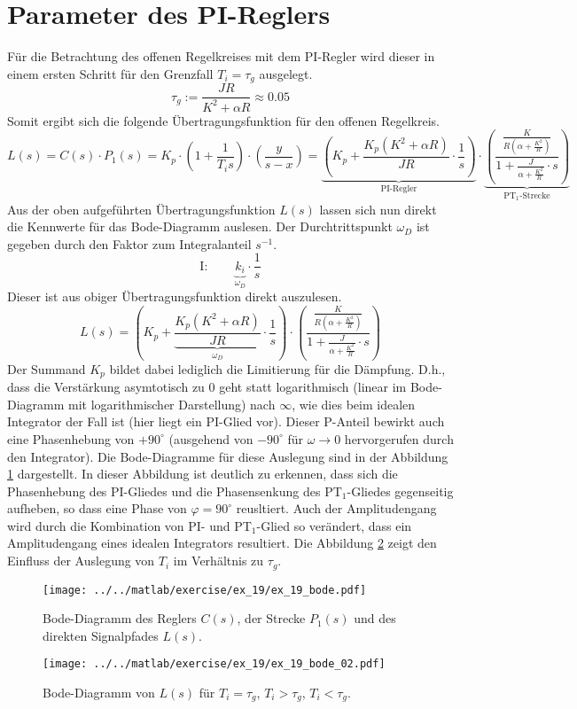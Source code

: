\section{Parameter des PI-Reglers}
Für die Betrachtung des offenen Regelkreises mit dem PI-Regler wird dieser
in einem ersten Schritt für den Grenzfall $T_i = \tau_g$ ausgelegt.
\[
	\tau_g := \frac{J R}{K^2 + \alpha R} \approx 0.05 
\]
Somit ergibt sich die folgende Übertragungsfunktion für den offenen
Regelkreis.
\[
	L(s)
	= C(s) \cdot P_1(s)
	= K_p \cdot \left(
		1 + \frac{1}{T_i s}
	\right) \cdot \left(
		\frac{y}{s-x}
	\right)
	= \underbrace{\left(
		K_p + \frac{
			K_p \left(K^2 + \alpha R\right)
		}{JR} \cdot \frac{1}{s}
	\right)}_{\text{PI-Regler}} \cdot \underbrace{\left(
		\frac{
			\frac{K}{R \left(\alpha + \frac{K^2}{R}\right)}
		}{
			1 + \frac{J}{\alpha + \frac{K^2}{R}} \cdot s
		}
	\right)}_{\text{PT$_1$-Strecke}}
\]
Aus der oben aufgeführten Übertragungsfunktion $L(s)$ lassen sich nun
direkt die Kennwerte für das Bode-Diagramm auslesen. Der Durchtrittspunkt
$\omega_D$ ist gegeben durch den Faktor zum Integralanteil $s^{-1}$.
\[
	\text{I}: \qquad \underbrace{k_i}_{\omega_D} \cdot \frac{1}{s}
\]
Dieser ist aus obiger Übertragungsfunktion direkt auszulesen.
\[
	L(s) = \left(
		K_p + \underbrace{\frac{
			K_p \left(K^2 + \alpha R\right)}{JR}}_{\omega_D}
		\cdot \frac{1}{s}
	\right) \cdot \left(
		\frac{
			\frac{K}{R \left(\alpha + \frac{K^2}{R}\right)}
		}{
			1 + \frac{J}{\alpha + \frac{K^2}{R}} \cdot s
		}
	\right)
\]
Der Summand $K_p$ bildet dabei lediglich die Limitierung für die Dämpfung.
D.h., dass die Verstärkung asymtotisch zu 0 geht statt logarithmisch (linear
im Bode-Diagramm mit logarithmischer Darstellung) nach $\infty$, wie dies
beim idealen Integrator der Fall ist (hier liegt ein PI-Glied vor).
Dieser P-Anteil bewirkt auch eine Phasenhebung von $+90^{\circ}$ (ausgehend
von $-90^{\circ}$ für $\omega \rightarrow 0$ hervorgerufen durch den
Integrator). Die Bode-Diagramme für diese Auslegung sind in der Abbildung
\ref{fig:ex_19_bode_border} dargestellt. In dieser Abbildung ist deutlich
zu erkennen, dass sich die Phasenhebung des PI-Gliedes und die Phasensenkung
des PT$_1$-Gliedes gegenseitig aufheben, so dass eine Phase von
$\varphi = 90^{\circ}$ reusltiert. Auch der Amplitudengang wird durch die
Kombination von PI- und PT$_1$-Glied so verändert, dass ein Amplitudengang
eines idealen Integrators resultiert. Die Abbildung
\ref{fig:ex_19_bode_variants} zeigt den Einfluss der Auslegung von $T_i$
im Verhältnis zu $\tau_g$.

\begin{figure}[h!]
	\centering
	\texttt{[image: ../../matlab/exercise/ex\_19/ex\_19\_bode.pdf]}
	\caption{Bode-Diagramm des Reglers $C(s)$, der Strecke $P_1(s)$ und des
		direkten Signalpfades $L(s)$.}
	\label{fig:ex_19_bode_border}
\end{figure}

\begin{figure}[h!]
	\centering
	\texttt{[image: ../../matlab/exercise/ex\_19/ex\_19\_bode\_02.pdf]}
	\caption{Bode-Diagramm von $L(s)$ für $T_i = \tau_g$,
		$T_i > \tau_g$, $T_i < \tau_g$.}
	\label{fig:ex_19_bode_variants}
\end{figure}
